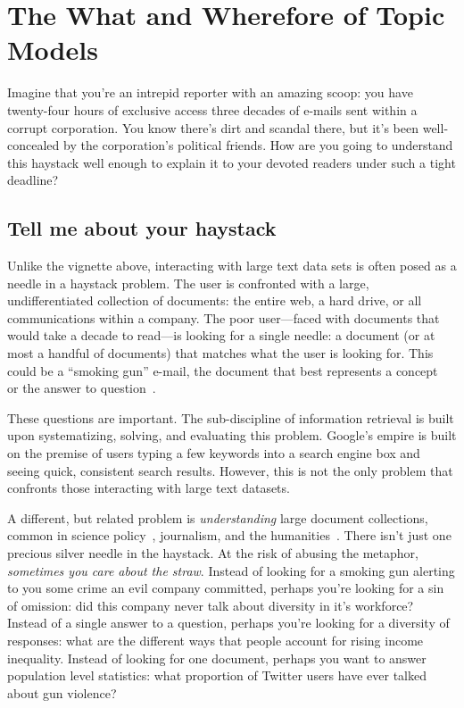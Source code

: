 
\chapter{The What and Wherefore of Topic Models}
\label{ch:intro}

Imagine that you're an intrepid reporter with an amazing scoop: you have
twenty-four hours of exclusive access three decades of e-mails sent within a
corrupt corporation.  You know there's dirt and scandal there, but it's been
well-concealed by the corporation's political friends.  How are you going to
understand this haystack well enough to explain it to your devoted readers under
such a tight deadline?

\section{Tell me about your haystack}

Unlike the vignette above, interacting with large text data sets is often posed
as a needle in a haystack problem.  The user is confronted with a large,
undifferentiated collection of documents: the entire web, a hard drive, or all
communications within a company.  The poor user---faced with documents that
would take a decade to read---is looking for a single needle: a document (or at
most a handful of documents) that matches what the user is looking for.  This
could be a ``smoking gun'' e-mail, the document that best represents a
concept~\citep{Salton-68} or the answer to question~\citep{Hirschman-01}.

These questions are important.  The sub-discipline of information retrieval is
built upon systematizing, solving, and evaluating this problem.  Google's empire
is built on the premise of users typing a few keywords into a search engine box
and seeing quick, consistent search results.  However, this is not the only
problem that confronts those interacting with large text datasets.

A different, but related problem is \emph{understanding} large document
collections, common in science policy~\citep{talley-11}, journalism, and the
humanities~\citep{moretti-13}.  There isn't just one precious silver needle in
the haystack.  At the risk of abusing the metaphor, \emph{sometimes you care
  about the straw}.  Instead of looking for a smoking gun alerting to you some
crime an evil company committed, perhaps you're looking for a sin of
omission: did this company never talk about diversity in it's workforce?
Instead of a single answer to a question, perhaps you're looking for a diversity
of responses: what are the different ways that people account for rising income
inequality.  Instead of looking for one document, perhaps you want to answer
population level statistics: what proportion of Twitter users have ever talked
about gun violence?

